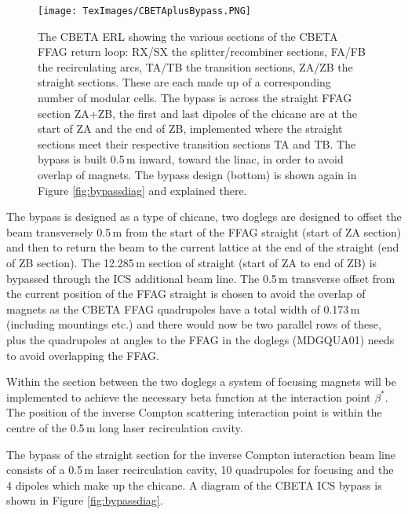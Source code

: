 \documentclass[11pt]{article}
\begin{document}
\begin{figure}[H]
\centering
\texttt{[image: TexImages/CBETAplusBypass.PNG]}
\caption{\label{fig:CBETAbypassdiag} The CBETA ERL showing the various sections of the CBETA FFAG return loop: RX/SX the splitter/recombiner sections, FA/FB the recirculating arcs, TA/TB the transition sections, ZA/ZB the straight sections. These are each made up of a corresponding number of modular cells. The bypass is across the straight FFAG section ZA+ZB, the first and last dipoles of the chicane are at the start of ZA and the end of ZB, implemented where the straight sections meet their respective transition sections TA and TB. The bypass is built 0.5\,m inward, toward the linac,  in order to avoid overlap of magnets. The bypass design (bottom) is shown again in Figure \ref{fig:bypassdiag} and explained there.}
\end{figure}

The bypass is designed as a type of chicane, two doglegs are designed to offset the beam transversely 0.5\,m from the start of the FFAG straight (start of ZA section) and then to return the beam to the current lattice at the end of the straight (end of ZB section). The 12.285\,m section of straight (start of ZA to end of ZB) is bypassed through the ICS additional beam line. The 0.5\,m transverse offset from the current position of the FFAG straight is chosen to avoid the overlap of magnets as the CBETA FFAG quadrupoles have a total width of 0.173\,m (including mountings etc.) and there would now be two parallel rows of these, plus the quadrupoles at angles to the FFAG in the doglegs (MDGQUA01) needs to avoid overlapping the FFAG.

Within the section between the two doglegs a system of focusing magnets will be implemented to achieve the necessary beta function at the interaction point $\beta^{*}$. The position of the inverse Compton scattering interaction point is within the centre of the 0.5\,m long laser recirculation cavity.

The bypass of the straight section for the inverse Compton interaction beam line consists of a 0.5\,m laser recirculation cavity, 10 quadrupoles for focusing and the 4 dipoles which make up the chicane. A diagram of the CBETA ICS bypass is shown in Figure \ref{fig:bypassdiag}.
\end{document}
